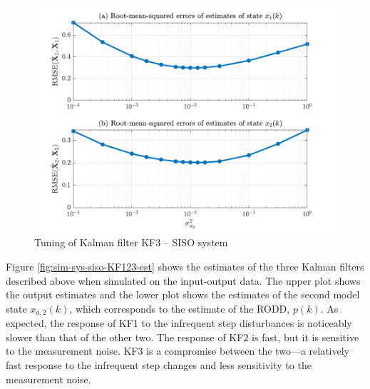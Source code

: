 \begin{figure}[htp]
	\centering
	\includegraphics[width=13cm]{images/rod_obs_sim1_3KF_Q_seed_6.pdf}
	\caption{Tuning of Kalman filter KF3 – SISO system}
	\label{fig:sim-sys-siso-KF3-tuning}
\end{figure}
Figure \ref{fig:sim-sys-siso-KF123-est} shows the estimates of the three Kalman filters described above when simulated on the input-output data. The upper plot shows the output estimates and the lower plot shows the estimates of the second model state $x_{a,2}(k)$, which corresponds to the estimate of the RODD, $p(k)$. As expected, the response of KF1 to the infrequent step disturbances is noticeably slower than that of the other two. The response of KF2 is fast, but it is sensitive to the measurement noise. KF3 is a compromise between the two—a relatively fast response to the infrequent step changes and less sensitivity to the measurement noise.

